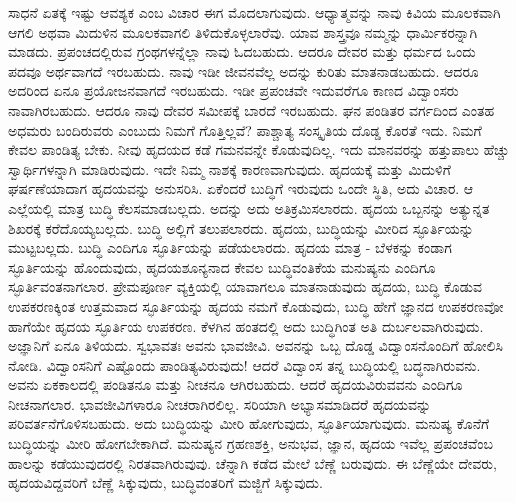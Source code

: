 ಸಾಧನೆ ಏತಕ್ಕೆ ಇಷ್ಟು ಆವಶ್ಯಕ ಎಂಬ ವಿಚಾರ ಈಗ ಮೊದಲಾಗುವುದು. ಆಧ್ಯಾತ್ಮವನ್ನು ನಾವು ಕಿವಿಯ ಮೂಲಕವಾಗಿ ಆಗಲಿ ಅಥವಾ ಮಿದುಳಿನ ಮೂಲಕವಾಗಲಿ ತಿಳಿದುಕೊಳ್ಳಲಾರೆವು. ಯಾವ ಶಾಸ್ತ್ರವೂ ನಮ್ಮನ್ನು ಧಾರ್ಮಿಕರನ್ನಾಗಿ ಮಾಡದು. ಪ್ರಪಂಚದಲ್ಲಿರುವ ಗ್ರಂಥಗಳನ್ನೆಲ್ಲಾ ನಾವು ಓದಬಹುದು. ಆದರೂ ದೇವರ ಮತ್ತು ಧರ್ಮದ ಒಂದು ಪದವೂ ಅರ್ಥವಾಗದೆ ಇರಬಹುದು. ನಾವು ಇಡೀ ಜೀವನವೆಲ್ಲ ಅದನ್ನು ಕುರಿತು ಮಾತನಾಡಬಹುದು. ಆದರೂ ಅದರಿಂದ ಏನೂ ಪ್ರಯೋಜನವಾಗದೆ ಇರಬಹುದು. ಇಡೀ ಪ್ರಪಂಚವೇ ಇದುವರೆಗೂ ಕಾಣದ ವಿದ್ವಾಂಸರು ನಾವಾಗಿರಬಹುದು. ಆದರೂ ನಾವು ದೇವರ ಸಮೀಪಕ್ಕೆ ಬಾರದೆ ಇರಬಹುದು. ಘನ ಪಂಡಿತರ ವರ್ಗದಿಂದ ಎಂತಹ ಅಧಮರು ಬಂದಿರುವರು ಎಂಬುದು ನಿಮಗೆ ಗೊತ್ತಿಲ್ಲವೆ? ಪಾಶ್ಚಾತ್ಯ ಸಂಸ್ಕೃತಿಯ ದೊಡ್ಡ ಕೊರತೆ ಇದು. ನಿಮಗೆ ಕೇವಲ ಪಾಂಡಿತ್ಯ ಬೇಕು. ನೀವು ಹೃದಯದ ಕಡೆ ಗಮನವನ್ನೇ ಕೊಡುವುದಿಲ್ಲ. ಇದು ಮಾನವರನ್ನು ಹತ್ತುಪಾಲು ಹೆಚ್ಚು ಸ್ವಾರ್ಥಿಗಳನ್ನಾಗಿ ಮಾಡಿರುವುದು. ಇದೇ ನಿಮ್ಮ ನಾಶಕ್ಕೆ ಕಾರಣವಾಗುವುದು. ಹೃದಯಕ್ಕೆ ಮತ್ತು ಮಿದುಳಿಗೆ ಘರ್ಷಣೆಯಾದಾಗ ಹೃದಯವನ್ನು ಅನುಸರಿಸಿ. ಏಕೆಂದರೆ ಬುದ್ಧಿಗೆ ಇರುವುದು ಒಂದೇ ಸ್ಥಿತಿ, ಅದು ವಿಚಾರ. ಆ ಎಲ್ಲೆಯಲ್ಲಿ ಮಾತ್ರ ಬುದ್ಧಿ ಕೆಲಸಮಾಡಬಲ್ಲದು. ಅದನ್ನು ಅದು ಅತಿಕ್ರಮಿಸಲಾರದು. ಹೃದಯ ಒಬ್ಬನನ್ನು ಅತ್ಯುನ್ನತ ಶಿಖರಕ್ಕೆ ಕರೆದೊಯ್ಯಬಲ್ಲದು. ಬುದ್ಧಿ ಅಲ್ಲಿಗೆ ತಲುಪಲಾರದು. ಹೃದಯ, ಬುದ್ಧಿಯನ್ನು ಮೀರಿದ ಸ್ಫೂರ್ತಿಯನ್ನು ಮುಟ್ಟಬಲ್ಲದು. ಬುದ್ಧಿ ಎಂದಿಗೂ ಸ್ಫೂರ್ತಿಯನ್ನು ಪಡೆಯಲಾರದು. ಹೃದಯ ಮಾತ್ರ - ಬೆಳಕನ್ನು ಕಂಡಾಗ ಸ್ಫೂರ್ತಿಯನ್ನು ಹೊಂದುವುದು, ಹೃದಯಶೂನ್ಯನಾದ ಕೇವಲ ಬುದ್ಧಿವಂತಿಕೆಯ ಮನುಷ್ಯನು ಎಂದಿಗೂ ಸ್ಫೂರ್ತಿವಂತನಾಗಲಾರ. ಪ್ರೇಮಪೂರ್ಣ ವ್ಯಕ್ತಿಯಲ್ಲಿ ಯಾವಾಗಲೂ ಮಾತನಾಡುವುದು ಹೃದಯ, ಬುದ್ಧಿ ಕೊಡುವ ಉಪಕರಣಕ್ಕಿಂತ ಉತ್ತಮವಾದ ಸ್ಫೂರ್ತಿಯನ್ನು ಹೃದಯ ನಮಗೆ ಕೊಡುವುದು, ಬುದ್ಧಿ ಹೇಗೆ ಜ್ಞಾನದ ಉಪಕರಣವೋ ಹಾಗೆಯೇ ಹೃದಯ ಸ್ಫೂರ್ತಿಯ ಉಪಕರಣ. ಕೆಳಗಿನ ಹಂತದಲ್ಲಿ ಅದು ಬುದ್ಧಿಗಿಂತ ಅತಿ ದುರ್ಬಲವಾಗಿರುವುದು. ಅಜ್ಞಾನಿಗೆ ಏನೂ ತಿಳಿಯದು. ಸ್ವಭಾವತಃ ಅವನು ಭಾವಜೀವಿ. ಅವನನ್ನು ಒಬ್ಬ ದೊಡ್ಡ ವಿದ್ವಾಂಸನೊಂದಿಗೆ ಹೋಲಿಸಿ ನೋಡಿ. ವಿದ್ವಾಂಸನಿಗೆ ಎಷ್ಟೊಂದು ಪಾಂಡಿತ್ಯವಿರುವುದು! ಆದರೆ ವಿದ್ವಾಂಸ ತನ್ನ ಬುದ್ಧಿಯಲ್ಲಿ ಬದ್ಧನಾಗಿರುವನು. ಅವನು ಏಕಕಾಲದಲ್ಲಿ ಪಂಡಿತನೂ ಮತ್ತು ನೀಚನೂ ಆಗಿರಬಹುದು. ಆದರೆ ಹೃದಯವಿರುವವನು ಎಂದಿಗೂ ನೀಚನಾಗಲಾರ. ಭಾವಜೀವಿಗಳಾರೂ ನೀಚರಾಗಿರಲಿಲ್ಲ. ಸರಿಯಾಗಿ ಅಭ್ಯಾಸಮಾಡಿದರೆ ಹೃದಯವನ್ನು ಪರಿವರ್ತನೆಗೊಳಿಸಬಹುದು. ಅದು ಬುದ್ಧಿಯನ್ನು ಮೀರಿ ಹೋಗುವುದು, ಸ್ಫೂರ್ತಿಯಾಗುವುದು. ಮನುಷ್ಯ ಕೊನೆಗೆ ಬುದ್ಧಿಯನ್ನು ಮೀರಿ ಹೋಗಬೇಕಾಗಿದೆ. ಮನುಷ್ಯನ ಗ್ರಹಣಶಕ್ತಿ, ಅನುಭವ, ಜ್ಞಾನ, ಹೃದಯ ಇವೆಲ್ಲ ಪ್ರಪಂಚವೆಂಬ ಹಾಲನ್ನು ಕಡೆಯುವುದರಲ್ಲಿ ನಿರತವಾಗಿರುವುವು. ಚೆನ್ನಾಗಿ ಕಡೆದ ಮೇಲೆ ಬೆಣ್ಣೆ ಬರುವುದು. ಈ ಬೆಣ್ಣೆಯೇ ದೇವರು, ಹೃದಯವಿದ್ದವರಿಗೆ ಬೆಣ್ಣೆ ಸಿಕ್ಕುವುದು, ಬುದ್ಧಿವಂತರಿಗೆ ಮಜ್ಜಿಗೆ ಸಿಕ್ಕುವುದು.

